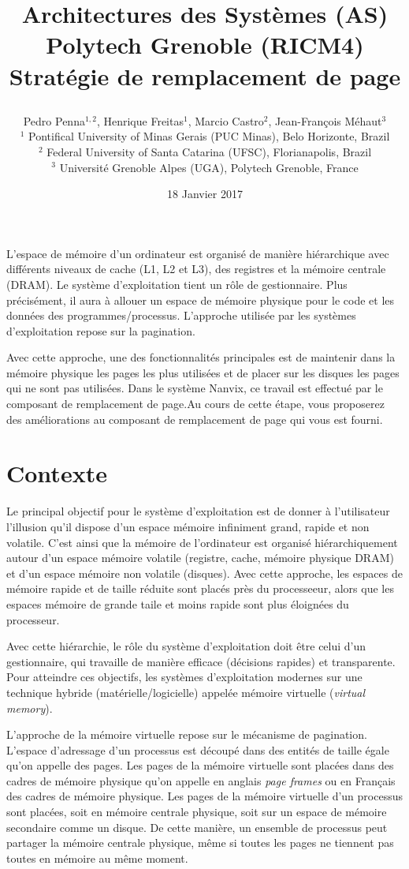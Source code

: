 \documentclass[a4paper,11pt]{article}
\title {Architectures des Systèmes (AS)\\
Polytech Grenoble (RICM4)\\
\vspace {0.3cm}
Stratégie de remplacement de page
\author {Pedro Penna$^{1,2}$, Henrique Freitas$^{1}$, Marcio Castro$^{2}$, Jean-François Méhaut$^{3}$
  \\
  $^{1}$ Pontifical University of Minas Gerais (PUC Minas), Belo Horizonte, Brazil\\
  $^{2}$ Federal University of Santa Catarina (UFSC), Florianapolis, Brazil\\
  $^{3}$ Université Grenoble Alpes (UGA), Polytech Grenoble, France
  }
\date {18 Janvier 2017}
}
\begin{document}
\maketitle

L'espace de mémoire d'un ordinateur est organisé de manière hiérarchique avec différents niveaux
de cache (L1, L2 et L3), des registres et la mémoire centrale (DRAM). Le système
d'exploitation tient un rôle de gestionnaire. Plus précisément, il aura à allouer un espace
de mémoire physique pour le code et les données des programmes/processus. L'approche utilisée
par les systèmes d'exploitation repose sur la pagination.

Avec cette approche, une des fonctionnalités principales est de maintenir dans la mémoire physique
les pages les plus utilisées et de placer sur les disques les pages qui ne sont pas utilisées. Dans
le système Nanvix, ce travail est effectué par le composant de remplacement de page.Au cours de cette
étape, vous proposerez des améliorations au composant de remplacement de page qui vous est fourni.


\section*{Contexte}

Le principal objectif pour le système d'exploitation est de donner à
l'utilisateur l'illusion qu'il dispose d'un espace mémoire infiniment
grand, rapide et non volatile. C'est ainsi que la mémoire de
l'ordinateur est organisé hiérarchiquement autour d'un espace mémoire
volatile (registre, cache, mémoire physique DRAM) et d'un espace
mémoire non volatile (disques).  Avec cette approche, les espaces de
mémoire rapide et de taille réduite sont placés près du processeeur,
alors que les espaces mémoire de grande taile et moins rapide sont
plus éloignées du processeur.

Avec cette hiérarchie, le rôle du système d'exploitation doit être
celui d'un gestionnaire, qui travaille de manière efficace (décisions
rapides) et transparente. Pour atteindre ces objectifs, les systèmes
d'exploitation modernes sur une technique hybride
(matérielle/logicielle) appelée mémoire virtuelle ({\em virtual
  memory}).

L'approche de la mémoire virtuelle repose sur le mécanisme de
pagination. L'espace d'adressage d'un processus est découpé dans des
entités de taille égale qu'on appelle des pages. Les pages de la
mémoire virtuelle sont placées dans des cadres de mémoire physique
qu'on appelle en anglais {\em page frames} ou en Français des cadres
de mémoire physique. Les pages de la mémoire virtuelle d'un processus
sont placées, soit en mémoire centrale physique, soit sur un espace de
mémoire secondaire comme un disque.  De cette manière, un ensemble de
processus peut partager la mémoire centrale physique, même si toutes
les pages ne tiennent pas toutes en mémoire au même moment.
\end{document}

